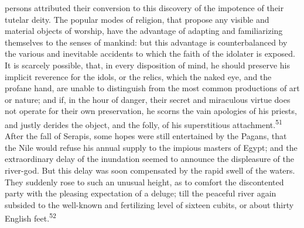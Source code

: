 persons attributed their conversion to this discovery of the
impotence of their tutelar deity. The popular modes of religion,
that propose any visible and material objects of worship, have
the advantage of adapting and familiarizing themselves to the
senses of mankind: but this advantage is counterbalanced by the
various and inevitable accidents to which the faith of the
idolater is exposed. It is scarcely possible, that, in every
disposition of mind, he should preserve his implicit reverence
for the idols, or the relics, which the naked eye, and the
profane hand, are unable to distinguish from the most common
productions of art or nature; and if, in the hour of danger,
their secret and miraculous virtue does not operate for their own
preservation, he scorns the vain apologies of his priests, and
justly derides the object, and the folly, of his superstitious
attachment.\textsuperscript{51} After the fall of Serapis, some hopes were still
entertained by the Pagans, that the Nile would refuse his annual
supply to the impious masters of Egypt; and the extraordinary
delay of the inundation seemed to announce the displeasure of the
river-god. But this delay was soon compensated by the rapid swell
of the waters. They suddenly rose to such an unusual height, as
to comfort the discontented party with the pleasing expectation
of a deluge; till the peaceful river again subsided to the
well-known and fertilizing level of sixteen cubits, or about
thirty English feet.\textsuperscript{52}






